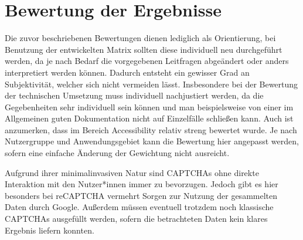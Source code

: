 \chapter{Bewertung der Ergebnisse}
\label{ch:bewertungergebnisse}

Die zuvor beschriebenen Bewertungen dienen lediglich als Orientierung, 
bei Benutzung der entwickelten Matrix sollten diese individuell neu durchgeführt werden,
da je nach Bedarf die vorgegebenen Leitfragen abgeändert oder anders interpretiert werden können.
Dadurch entsteht ein gewisser Grad an Subjektivität, welcher sich nicht vermeiden lässt.
Insbesondere bei der Bewertung der technischen Umsetzung muss individuell nachjustiert werden,
da die Gegebenheiten sehr individuell sein können und man beispielsweise von einer im Allgemeinen guten Dokumentation nicht auf Einzelfälle schließen kann.
Auch ist anzumerken, dass im Bereich Accessibility relativ streng bewertet wurde. 
Je nach Nutzergruppe und Anwendungsgebiet kann die Bewertung hier angepasst werden, sofern eine einfache Änderung der Gewichtung nicht ausreicht.

Aufgrund ihrer minimalinvasiven Natur sind CAPTCHAs ohne direkte Interaktion mit den Nutzer*innen immer zu bevorzugen.
Jedoch gibt es hier besonders bei reCAPTCHA vermehrt Sorgen zur Nutzung der gesammelten Daten durch Google. 
Außerdem müssen eventuell trotzdem noch klassische CAPTCHAs ausgefüllt werden, sofern die betrachteten Daten kein klares Ergebnis liefern konnten.